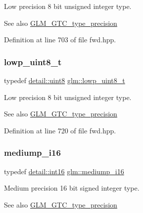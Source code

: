 Low precision 8 bit unsigned integer type. \begin{DoxySeeAlso}{See also}
\mbox{\hyperlink{group__gtc__type__precision}{G\+L\+M\+\_\+\+G\+T\+C\+\_\+type\+\_\+precision}} 
\end{DoxySeeAlso}


Definition at line 703 of file fwd.\+hpp.

\mbox{\label{group__gtc__type__precision_ga0910ef24195d1b8b26e34d73148c0c45}} 
\subsubsection{\texorpdfstring{lowp\_uint8\_t}{lowp\_uint8\_t}}
{\footnotesize\ttfamily typedef \mbox{\hyperlink{namespaceglm_1_1detail_aef2588f97d090cc19fbbe0c74fe17c8f}{detail\+::uint8}} \mbox{\hyperlink{group__gtc__type__precision_ga0910ef24195d1b8b26e34d73148c0c45}{glm\+::lowp\+\_\+uint8\+\_\+t}}}

Low precision 8 bit unsigned integer type. \begin{DoxySeeAlso}{See also}
\mbox{\hyperlink{group__gtc__type__precision}{G\+L\+M\+\_\+\+G\+T\+C\+\_\+type\+\_\+precision}} 
\end{DoxySeeAlso}


Definition at line 720 of file fwd.\+hpp.

\mbox{\label{group__gtc__type__precision_ga8454fc6a82c7bb787d0ac9663e08f63d}} 
\subsubsection{\texorpdfstring{mediump\_i16}{mediump\_i16}}
{\footnotesize\ttfamily typedef \mbox{\hyperlink{namespaceglm_1_1detail_a375938874ca4f0a0982ec6373b56117b}{detail\+::int16}} \mbox{\hyperlink{group__gtc__type__precision_ga8454fc6a82c7bb787d0ac9663e08f63d}{glm\+::mediump\+\_\+i16}}}

Medium precision 16 bit signed integer type. \begin{DoxySeeAlso}{See also}
\mbox{\hyperlink{group__gtc__type__precision}{G\+L\+M\+\_\+\+G\+T\+C\+\_\+type\+\_\+precision}} 
\end{DoxySeeAlso}


